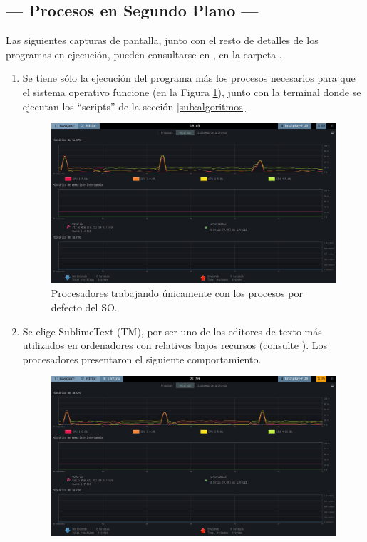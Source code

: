 \documentclass[11pt,a4paper]{article}
\begin{document}
\subsection{--- Procesos en Segundo Plano ---} %
\label{sub:segundo_plano}
Las siguientes capturas de pantalla, junto con el resto de detalles de los programas en ejecución, pueden consultarse en , en la carpeta . \vspace{-2mm}
\begin{enumerate}
	\item[\fbox{Sin procesos}] Se tiene sólo la ejecución del programa más los procesos necesarios para que el sistema operativo funcione (en la Figura \ref{fig:sin_procesos}), junto con la terminal donde se ejecutan los ``scripts'' de la sección \ref{sub:algoritmos}.
		\begin{figure}[hbt!]
			\centering
			\includegraphics[width= 0.9 \linewidth]{IMAGENES/6/1_sin_procesos}
			\caption{Procesadores trabajando únicamente con los procesos por defecto del SO.}
			\label{fig:sin_procesos}
		\end{figure}
		\newpage
	\item[\fbox{Editor de Texto}] Se elige SublimeText (TM), por ser uno de los editores de texto más utilizados en ordenadores con relativos bajos recursos (consulte ). Los procesadores presentaron el siguiente comportamiento.
		\begin{figure}[hbt!]
			\centering
			\includegraphics[width= 0.8 \linewidth]{IMAGENES/6/4_sublime_text}

\end{figure}
\end{enumerate}
\end{document}

